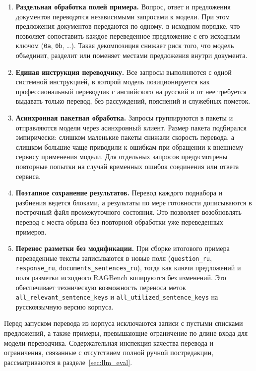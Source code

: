 \begin{enumerate}
\item \textbf{Раздельная обработка полей примера.}
Вопрос, ответ и предложения документов переводятся независимыми запросами
к модели. При этом предложения документов передаются по одному, в исходном
порядке, что позволяет сопоставить каждое переведенное предложение с его
исходным ключом (\texttt{0a}, \texttt{0b}, \dots). Такая декомпозиция снижает
риск того, что модель объединит, разделит или поменяет местами предложения
внутри документа.

\item \textbf{Единая инструкция переводчику.}
Все запросы выполняются с одной системной инструкцией, в которой модель
позиционируется как профессиональный переводчик с английского на русский
и от нее требуется выдавать только перевод, без рассуждений, пояснений и
служебных пометок.

\item \textbf{Асинхронная пакетная обработка.}
Запросы группируются в пакеты и отправляются модели через асинхронный клиент.
Размер пакета подбирался эмпирически: слишком маленькие пакеты снижали скорость
перевода, а слишком большие чаще приводили к ошибкам при обращении к внешнему
сервису применения модели. Для отдельных запросов предусмотрены повторные попытки на
случай временных ошибок соединения или ответа сервиса.

\item \textbf{Поэтапное сохранение результатов.}
Перевод каждого поднабора и разбиения ведется блоками, а результаты по мере
готовности дописываются в построчный файл промежуточного состояния. Это позволяет возобновлять
перевод с места обрыва без повторной обработки уже переведенных примеров.

\item \textbf{Перенос разметки без модификации.}
При сборке итогового примера переведенные тексты записываются в новые поля
(\texttt{question\_ru}, \texttt{response\_ru},
\texttt{documents\_sentences\_ru}), тогда как ключи предложений и поля разметки
исходного RAGBench копируются без изменений. Это обеспечивает техническую
возможность переноса меток \texttt{all\_relevant\_sentence\_keys} и
\texttt{all\_utilized\_sentence\_keys} на русскоязычную версию корпуса.
\end{enumerate}

Перед запуском перевода из корпуса исключаются записи с пустыми списками
предложений, а также примеры, превышающие ограничение по длине входа для
модели-переводчика. Содержательная инспекция качества перевода и ограничения,
связанные с отсутствием полной ручной постредакции, рассматриваются в
разделе~\ref{sec:llm_eval}.

